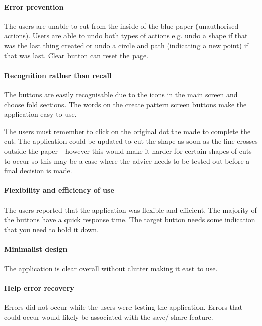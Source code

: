 \documentclass[11pt]{article}
\begin{document}
                \paragraph{Error prevention}
                The users are unable to cut from the inside of the blue paper (unauthorised actions). Users are able to undo both types of actions e.g. undo a shape if that was the last thing created or undo a circle and path (indicating a new point) if that was last. Clear button can reset the page. 

                \paragraph{Recognition rather than recall}
                The buttons are easily recognisable due to the icons in the main screen and choose fold sections. The words on the create pattern screen buttons make the application easy to use. 
                
                The users must remember to click on the original dot the made to complete the cut. The application could be updated to cut the shape as soon as the line crosses outside the paper - however this would make it harder for certain shapes of cuts to occur so this may be a case where the advice needs to be tested out before a final decision is made. 


                \paragraph{Flexibility and efficiency of use} 
                The users reported that the application was flexible and efficient. The majority of the buttons have a quick response time. The target button needs some indication that you need to hold it down.

                \paragraph{Minimalist design}
                The application is clear overall without clutter making it east to use.

                \paragraph{Help error recovery}
                Errors did not occur while the users were testing the application. Errors that could occur would likely be associated with the save/ share feature.
\end{document}

